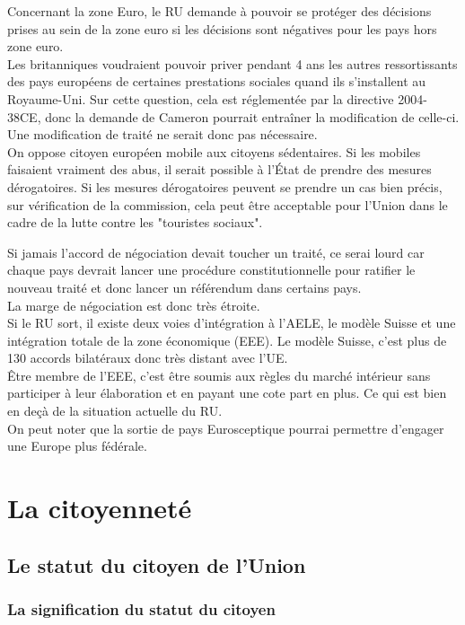 \documentclass[12pt, a4paper, openany]{book}
\begin{document}
Concernant la zone Euro, le RU demande à pouvoir se protéger des décisions prises au sein de la zone euro si les décisions sont négatives pour les pays hors zone euro. \\
Les britanniques voudraient pouvoir priver pendant 4 ans les autres ressortissants des pays européens de certaines prestations sociales quand ils s'installent au Royaume-Uni. Sur cette question, cela est réglementée par la directive 2004-38CE, donc la demande de Cameron pourrait entraîner la modification de celle-ci. Une modification de traité ne serait donc pas nécessaire. \\
On oppose citoyen européen mobile aux citoyens sédentaires. Si les mobiles faisaient vraiment des abus, il serait possible à l'État de prendre des mesures dérogatoires. Si les mesures dérogatoires peuvent se prendre un cas bien précis, sur vérification de la commission, cela peut être acceptable pour l'Union dans le cadre de la lutte contre les "touristes sociaux".


Si jamais l'accord de négociation devait toucher un traité, ce serai lourd car chaque pays devrait lancer une procédure constitutionnelle pour ratifier le nouveau traité et donc lancer un référendum dans certains pays. \\
La marge de négociation est donc très étroite. \\
Si le RU sort, il existe deux voies d'intégration à l'AELE, le modèle Suisse et une intégration totale de la zone économique (EEE). Le modèle Suisse, c'est plus de 130 accords bilatéraux donc très distant avec l'UE. \\
Être membre de l'EEE, c'est être soumis aux règles du marché intérieur sans participer à leur élaboration et en payant une cote part en plus. Ce qui est bien en deçà de la situation actuelle du RU. \\
On peut noter que la sortie de pays Eurosceptique pourrai permettre d'engager une Europe plus fédérale. 

\section{La citoyenneté}

\subsection{Le statut du citoyen de l'Union}

\subsubsection{La signification du statut du citoyen}
\end{document}
